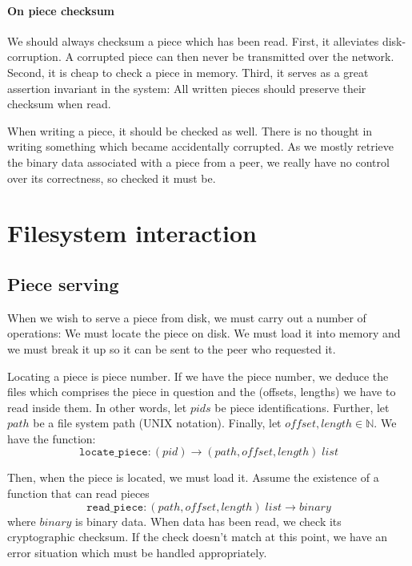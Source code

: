 \documentclass[a4paper]{memoir}
\begin{document}
\paragraph{On piece checksum}
We should always checksum a piece which has been read. First, it alleviates
disk-corruption. A corrupted piece can then never be transmitted over
the network. Second, it is cheap to check a piece in memory. Third, it
serves as a great assertion invariant in the system: All written
pieces should preserve their checksum when read.

When writing a piece, it should be checked as well. There is no
thought in writing something which became accidentally corrupted. As
we mostly retrieve the binary data associated with a piece from a
peer, we really have no control over its correctness, so checked it
must be.

\section{Filesystem interaction}
\subsection{Piece serving}
When we wish to serve a piece from disk, we must carry out a number of
operations: We must locate the piece on disk. We must load it into
memory and we must break it up so it can be sent to the peer who
requested it.

Locating a piece is piece number. If we have the piece
number, we deduce the files which comprises the piece in question and
the (offsets, lengths) we have to read inside them. In other
words, let $pids$ be piece identifications. Further, let $path$ be a
file system path (UNIX notation). Finally, let $offset, length \in
\mathbb{N}$. We have the function:
\begin{equation*}
  \mathtt{locate\_piece} \colon (pid) \to (path, offset, length)\; list
\end{equation*}

Then, when the piece is located, we must load it. Assume the existence
of a function that can read pieces
\begin{equation*}
  \mathtt{read\_piece} \colon (path, offset, length) \; list \to
  binary
\end{equation*}
where $binary$ is binary data. When data has been read, we check
its cryptographic checksum. If the check doesn't match at this point,
we have an error situation which must be handled appropriately.
\end{document}
